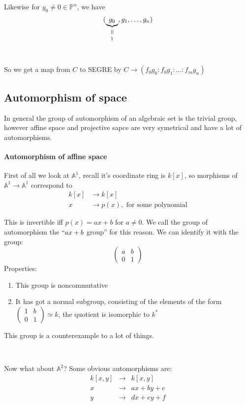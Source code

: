 Likewise for $y_0\neq 0\in \mathbb{P}^n$, we have \[(\bverteq{g_0}{1}, g_1,\ldots,g_n)\]

\

So we get a map from $C$ to SEGRE by $C\rightarrow (f_0g_0\colon f_0g_1\colon \ldots \colon f_mg_n)$


\subsection{Automorphism of space}
In general the group of automorphism of an algebraic set is the trivial group, however affine space and projective sapce are very symetrical and have a lot of automorphisms.

\paragraph*{Automorphism of affine space}

First of all we look at $\mathbb{A}^1$, recall it's coordinate ring is $k[x]$, so morphisms of $\mathbb{A}^1\rightarrow \mathbb{A}^1$ correspond to \begin{align*}
    k[x] &\rightarrow k[x]\\
    x&\rightarrow p(x), \text{ for some polynomial}
\end{align*}

This is invertible iff $p(x) = ax+b$ for $a\neq 0$. We call the group of automorphism the $``ax+b$ group'' for this reason. We can identify it with the group:\[\begin{pmatrix}
    a & b\\
    0 & 1
\end{pmatrix}\]
Properties:\begin{enumerate}
    \item This group is noncommutative
    \item It has got a normal subgroup, consisting of the elements of the form $\begin{pmatrix}
        1 & b\\
        0&1
    \end{pmatrix}\simeq k$, the quotient is isomorphic to $k^\ast$
\end{enumerate}

This group is a counterexample to a lot of things.

\

Now what about $\mathbb{A}^2$? Some obvious automorphisms are:\[\begin{array}{ccc}
    k[x,y]&\rightarrow &k[x,y]\\
    x&\rightarrow &ax+by+c\\
    y&\rightarrow &dx+ey+f
\end{array}\]

